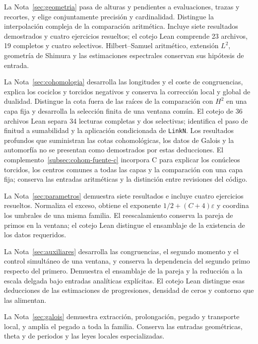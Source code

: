 La Nota~\ref{sec:geometria} pasa de alturas y pendientes a evaluaciones,
trazas y recortes, y elige conjuntamente precisión y cardinalidad.
Distingue la interpolación compleja de la comparación aritmética.
Incluye siete resultados demostrados y cuatro ejercicios resueltos;
el cotejo Lean comprende 23 archivos, 19 completos y cuatro selectivos.
Hilbert--Samuel aritmético, extensión $L^2$, geometría de Shimura y
las estimaciones espectrales conservan sus hipótesis de entrada.

La Nota~\ref{sec:cohomologia} desarrolla las longitudes y el coste
de congruencias, explica los cociclos y torcidos negativos y conserva
la corrección local y global de dualidad. Distingue la cota fuera
de las raíces de la comparación con $H^2$ en una capa fija y desarrolla
la selección finita de una ventana común. El cotejo de 36 archivos Lean
separa 34 lecturas completas y dos selectivas; identifica el paso
de finitud a sumabilidad y la aplicación condicionada de \texttt{LinkN}.
Los resultados profundos que suministran las cotas cohomológicas,
los datos de Galois y la automorfía no se presentan como demostrados
por estas deducciones. El complemento~\ref{subsec:cohom-fuente-c}
incorpora C para explicar los conúcleos torcidos, los centros comunes
a todas las capas y la comparación con una capa fija; conserva
las entradas aritméticas y la distinción entre revisiones del código.

La Nota~\ref{sec:parametros} demuestra siete resultados e incluye cuatro
ejercicios resueltos. Normaliza el exceso, obtiene el exponente
$1/2+(C+4)\varepsilon$ y coordina los umbrales de una misma familia.
El reescalamiento conserva la pareja de primos en la ventana; el cotejo
Lean distingue el ensamblaje de la existencia de los datos requeridos.

La Nota~\ref{sec:auxiliares} desarrolla las congruencias, el segundo
momento y el control simultáneo de una ventana, y conserva la dependencia
del segundo primo respecto del primero. Demuestra el ensamblaje de la
pareja y la reducción a la escala delgada bajo entradas analíticas
explícitas. El cotejo Lean distingue esas deducciones de las estimaciones
de progresiones, densidad de ceros y contorno que las alimentan.

La Nota~\ref{sec:galois} demuestra extracción, prolongación, pegado
y transporte local, y amplía el pegado a toda la familia.
Conserva las entradas geométricas, theta y de periodos y las leyes
locales especializadas.

